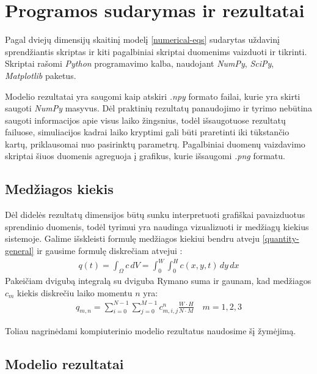 \section{Programos sudarymas ir rezultatai}

Pagal dviejų dimensijų skaitinį modelį \eqref{numerical-eqs} sudarytas uždavinį sprendžiantis skriptas ir kiti pagalbiniai skriptai duomenims vaizduoti ir tikrinti. Skriptai rašomi \textit{Python} programavimo kalba, naudojant \textit{NumPy}, \textit{SciPy}, \textit{Matplotlib} paketus. 

Modelio rezultatai yra saugomi kaip atskiri \textit{.npy} formato failai, kurie yra skirti saugoti \mbox{\textit{NumPy}} masyvus. Dėl praktinių rezultatų panaudojimo ir tyrimo nebūtina saugoti informacijos apie visus laiko žingsnius, todėl išsaugotuose rezultatų failuose, simuliacijos kadrai laiko kryptimi gali būti praretinti iki tūkstančio kartų, priklausomai nuo pasirinktų parametrų. Pagalbiniai duomenų vaizdavimo skriptai šiuos duomenis agreguoja į grafikus, kurie išsaugomi \textit{.png} formatu.

\subsection*{Medžiagos kiekis}

Dėl didelės rezultatų dimensijos būtų sunku interpretuoti grafiškai pavaizduotus sprendinio duomenis, todėl tyrimui yra naudinga vizualizuoti ir medžiagų kiekius sistemoje. Galime išskleisti formulę medžiagos kiekiui bendru atveju \eqref{quantity-general} ir gausime formulę diskrečiam atvejui \cite{strangCalculusVolume32016}:
\begin{align}
    q(t) = \int_\Omega c\,dV = \int_0^W \int_0^H c(x, y, t)\,dy\,dx
\end{align}
Pakeičiam dvigubą integralą su dviguba Rymano suma ir gaunam, kad medžiagos $c_m$ kiekis diskrečiu laiko momentu $n$ yra:
\begin{align}
    q_{m, n}= \sum_{i=0}^{N-1}\sum_{j=0}^{M-1} c_{m, i,j}^n \frac{W\cdot H}{N\cdot M} \quad m=1, 2, 3
\end{align}

Toliau nagrinėdami kompiuterinio modelio rezultatus naudosime šį žymėjimą.

\newpage
\subsection{Modelio rezultatai}

